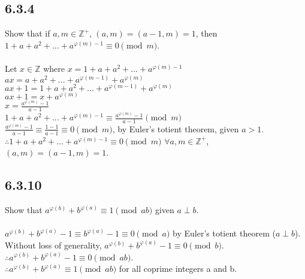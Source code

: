 \documentclass{article}
\begin{document}
\subsection{6.3.4}
Show that if $a, m \in \mathbb{Z}^+$, $(a,m)=(a-1,m)=1$,
then $1+a+a^2+...+a^{\varphi(m)-1}\equiv0\pmod{m}$.
\\
\\Let $x \in \mathbb{Z}$ where $x = 1+a+a^2+...+a^{\varphi(m)-1}$
\\$ax = a+a^2+...+a^{\varphi(m-1)}+a^{\varphi(m)}$
\\$ax+1 = 1+a+a^2+...+a^{\varphi(m-1)}+a^{\varphi(m)}$
\\$ax+1 = x+a^{\varphi(m)}$
\\$x = \frac{a^{\varphi(m)}-1}{a-1}$
\\$1+a+a^2+...+a^{\varphi(m)-1} \equiv \frac{a^{\varphi(m)}-1}{a-1} \pmod{m}$
\\$\frac{a^{\varphi(m)}-1}{a-1} \equiv \frac{1-1}{a-1} \equiv 0 \pmod{m}$,
by Euler's totient theorem, given $a > 1$.
\\$\therefore 1+a+a^2+...+a^{\varphi(m)-1}\equiv0\pmod{m}$
\;\;$\forall a, m \in \mathbb{Z}^+$, $(a,m)=(a-1,m)=1$.
\newpage

\subsection{6.3.10}
Show that $a^{\varphi(b)}+b^{\varphi(a)}\equiv1\pmod{ab}$ given $a \perp b$.
\\
\\$a^{\varphi(b)}+b^{\varphi(a)}-1\equiv
b^{\varphi(a)}-1 \equiv
0 \pmod{a}$ by Euler's totient theorem ($a \perp b$).
\\Without loss of generality,
$a^{\varphi(b)}+b^{\varphi(a)}-1\equiv0\pmod{b}$.
\\$\therefore a^{\varphi(b)}+b^{\varphi(a)}-1\equiv0\pmod{ab}$.
\\$\therefore a^{\varphi(b)}+b^{\varphi(a)}\equiv1\pmod{ab}$
for all coprime integers a and b.
\end{document}
